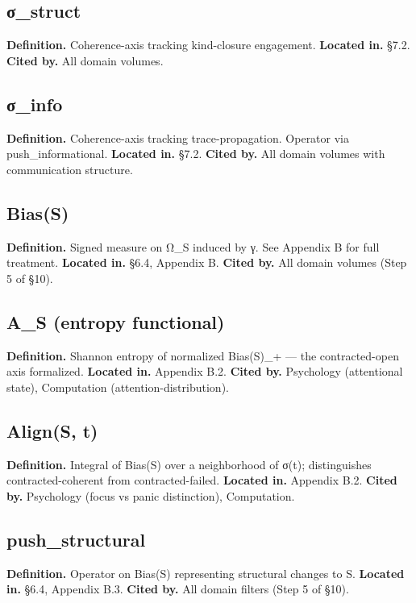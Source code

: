\documentclass[11pt, openany]{book}
\begin{document}
\subsection{σ\_\allowbreak{}struct}
\textbf{Definition.} Coherence-axis tracking kind-closure engagement.
\textbf{Located in.} §7.2.
\textbf{Cited by.} All domain volumes.

\subsection{σ\_\allowbreak{}info}
\textbf{Definition.} Coherence-axis tracking trace-propagation. Operator via push\_\allowbreak{}informational.
\textbf{Located in.} §7.2.
\textbf{Cited by.} All domain volumes with communication structure.

\subsection{Bias(S)}
\textbf{Definition.} Signed measure on Ω\_\allowbreak{}S induced by γ. See Appendix B for full treatment.
\textbf{Located in.} §6.4, Appendix B.
\textbf{Cited by.} All domain volumes (Step 5 of §10).

\subsection{A\_\allowbreak{}S (entropy functional)}
\textbf{Definition.} Shannon entropy of normalized Bias(S)\_\allowbreak{}+ --- the contracted-open axis formalized.
\textbf{Located in.} Appendix B.2.
\textbf{Cited by.} Psychology (attentional state), Computation (attention-distribution).

\subsection{Align(S, t)}
\textbf{Definition.} Integral of Bias(S) over a neighborhood of σ(t); distinguishes contracted-coherent from contracted-failed.
\textbf{Located in.} Appendix B.2.
\textbf{Cited by.} Psychology (focus vs panic distinction), Computation.

\subsection{push\_\allowbreak{}structural}
\textbf{Definition.} Operator on Bias(S) representing structural changes to S.
\textbf{Located in.} §6.4, Appendix B.3.
\textbf{Cited by.} All domain filters (Step 5 of §10).
\end{document}
